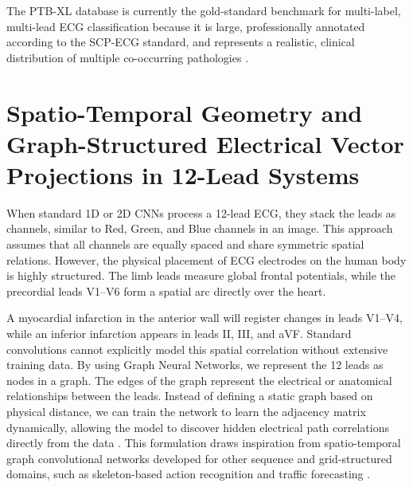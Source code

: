 \documentclass[12pt,a4paper]{report}
\begin{document}
\begin{table}[H]
\caption{Comparative Analysis of Standard ECG Databases}
\label{tab:databases}
\centering
{}
\end{table}

The PTB-XL database is currently the gold-standard benchmark for multi-label, multi-lead ECG classification because it is large, professionally annotated according to the SCP-ECG standard, and represents a realistic, clinical distribution of multiple co-occurring pathologies \cite{wagner2020ptbxl, strodthoff2021deep}.

\section{Spatio-Temporal Geometry and Graph-Structured Electrical Vector Projections in 12-Lead Systems}
When standard 1D or 2D CNNs process a 12-lead ECG, they stack the leads as channels, similar to Red, Green, and Blue channels in an image. This approach assumes that all channels are equally spaced and share symmetric spatial relations. However, the physical placement of ECG electrodes on the human body is highly structured. The limb leads measure global frontal potentials, while the precordial leads V1--V6 form a spatial arc directly over the heart.

A myocardial infarction in the anterior wall will register changes in leads V1--V4, while an inferior infarction appears in leads II, III, and aVF. Standard convolutions cannot explicitly model this spatial correlation without extensive training data. By using Graph Neural Networks, we represent the 12 leads as nodes in a graph. The edges of the graph represent the electrical or anatomical relationships between the leads. Instead of defining a static graph based on physical distance, we can train the network to learn the adjacency matrix dynamically, allowing the model to discover hidden electrical path correlations directly from the data \cite{zhang2023strege, maurer2025xgnn}. This formulation draws inspiration from spatio-temporal graph convolutional networks developed for other sequence and grid-structured domains, such as skeleton-based action recognition \cite{yan2018spatial} and traffic forecasting \cite{yu2018spatio}.
\end{document}
